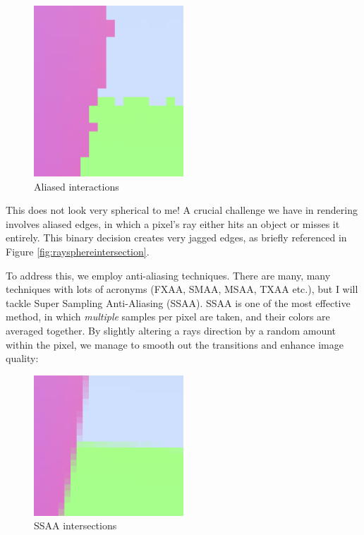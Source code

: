\documentclass[12pt]{article}
\begin{document}
\begin{figure}[H]
    \centering
    \includegraphics[width=0.5\textwidth]{images/aliasing/no-aliasing.png}
    \caption{Aliased interactions}
    \label{fig:aliasedintersection}
\end{figure}

This does not look very spherical to me! A crucial challenge we have in rendering involves aliased edges, in which a pixel's ray either hits an object or misses it entirely. This binary decision creates very jagged edges, as briefly referenced in Figure \ref{fig:raysphereintersection}.

To address this, we employ anti-aliasing techniques. There are many, many techniques with lots of acronyms (FXAA, SMAA, MSAA, TXAA etc.), but I will tackle Super Sampling Anti-Aliasing (SSAA). SSAA is one of the most effective method, in which \textit{multiple} samples per pixel are taken, and their colors are averaged together. By  slightly altering a rays direction by a random amount within the pixel, we manage to smooth out the transitions and enhance image quality:

\begin{figure}[H]
    \centering
    \includegraphics[width=0.5\textwidth]{images/aliasing/aliased.png}
    \caption{SSAA intersections}
    \label{fig:antialiasedintersection}
\end{figure}
\end{document}
